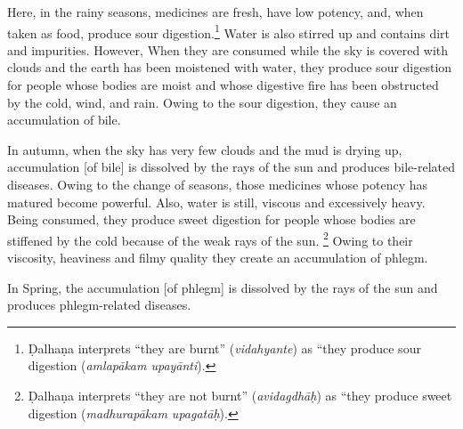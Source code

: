 \begin{translation}
\item [11]
Here, in the rainy seasons, medicines are fresh, have low potency, and, when taken as food, %
produce sour digestion.\footnote{%
    Ḍalhaṇa \citep[26]{vulgate} interprets ``they are burnt'' (\emph{vidahyante}) as ``they produce sour digestion (\emph{amlapākam upayānti}).} %
Water is also stirred up %
and contains dirt and impurities. %
However, %
When they are consumed %
while the sky is covered with clouds %
and the earth has been moistened with water, %
they produce sour digestion %
for people whose bodies are moist %
and whose digestive fire has been obstructed by the cold, wind, and rain. %
Owing to the sour digestion, they cause an accumulation of bile.%


In autumn, %
when the sky has very few clouds %
and the mud is drying up, %
accumulation [of bile] is dissolved by the rays of the sun %
and produces bile-related diseases. %
Owing to the change of seasons, %
those medicines whose potency has matured %
become powerful. 
Also, water is still, viscous %
and excessively heavy. %
Being consumed, they produce sweet digestion %
for people whose bodies are stiffened by the cold %
because of the weak rays of the sun.%
    \footnote{Ḍalhaṇa \citep[26]{vulgate} interprets ``they are not burnt'' (\emph{avidagdhāḥ}) as ``they produce sweet digestion (\emph{madhurapākam upagatāḥ}). }
Owing to their viscosity, heaviness and filmy quality %
they create an accumulation of phlegm. %

In Spring, the accumulation [of phlegm] is dissolved by the rays of the sun and produces phlegm-related diseases.  %


\end{translation}
